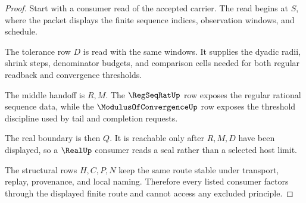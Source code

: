 \begin{proof}
Start with a consumer read of the accepted carrier. The read begins at $S$, where the packet displays the finite sequence indices, observation windows, and schedule.

The tolerance row $D$ is read with the same windows. It supplies the dyadic radii, shrink steps, denominator budgets, and comparison cells needed for both regular readback and convergence thresholds.

The middle handoff is $R,M$. The $\RegSeqRatUp$ row exposes the regular rational sequence data, while the $\ModulusOfConvergenceUp$ row exposes the threshold discipline used by tail and completion requests.

The real boundary is then $Q$. It is reachable only after $R,M,D$ have been displayed, so a $\RealUp$ consumer reads a seal rather than a selected host limit.

The structural rows $H,C,P,N$ keep the same route stable under transport, replay, provenance, and local naming. Therefore every listed consumer factors through the displayed finite route and cannot access any excluded principle.
\end{proof}


\begin{closurestatus}{\BishopSequenceUp}
  \theoryclosure{\seedClosure}
  \formalstatus{\unformalizedV}
\end{closurestatus}
